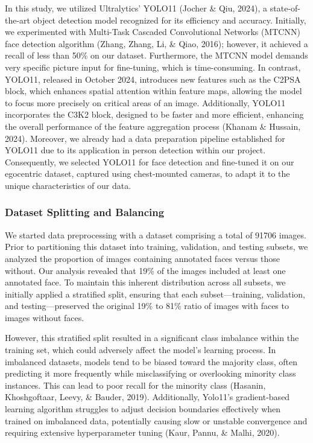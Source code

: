 \documentclass[
  man,floatsintext]{apa6}
\begin{document}
In this study, we utilized Ultralytics' YOLO11 (Jocher \& Qiu, 2024), a state-of-the-art object detection model recognized for its efficiency and accuracy. Initially, we experimented with Multi-Task Cascaded Convolutional Networks (MTCNN) face detection algorithm (Zhang, Zhang, Li, \& Qiao, 2016); however, it achieved a recall of less than 50\% on our dataset. Furthermore, the MTCNN model demands very specific picture input for fine-tuning, which is time-consuming. In contrast, YOLO11, released in October 2024, introduces new features such as the C2PSA block, which enhances spatial attention within feature maps, allowing the model to focus more precisely on critical areas of an image. Additionally, YOLO11 incorporates the C3K2 block, designed to be faster and more efficient, enhancing the overall performance of the feature aggregation process (Khanam \& Hussain, 2024). Moreover, we already had a data preparation pipeline established for YOLO11 due to its application in person detection within our project. Consequently, we selected YOLO11 for face detection and fine-tuned it on our egocentric dataset, captured using chest-mounted cameras, to adapt it to the unique characteristics of our data.

\subsubsection{Dataset Splitting and Balancing}\label{dataset-splitting-and-balancing}

We started data preprocessing with a dataset comprising a total of 91706 images. Prior to partitioning this dataset into training, validation, and testing subsets, we analyzed the proportion of images containing annotated faces versus those without. Our analysis revealed that 19\% of the images included at least one annotated face. To maintain this inherent distribution across all subsets, we initially applied a stratified split, ensuring that each subset---training, validation, and testing---preserved the original 19\% to 81\% ratio of images with faces to images without faces.

However, this stratified split resulted in a significant class imbalance within the training set, which could adversely affect the model's learning process. In imbalanced datasets, models tend to be biased toward the majority class, often predicting it more frequently while misclassifying or overlooking minority class instances. This can lead to poor recall for the minority class (Hasanin, Khoshgoftaar, Leevy, \& Bauder, 2019). Additionally, Yolo11's gradient-based learning algorithm struggles to adjust decision boundaries effectively when trained on imbalanced data, potentially causing slow or unstable convergence and requiring extensive hyperparameter tuning (Kaur, Pannu, \& Malhi, 2020).
\end{document}

